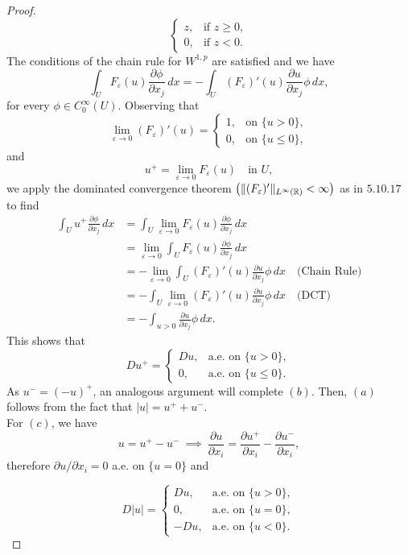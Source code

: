 \documentclass{article}
\DeclarePairedDelimiter{\norm}{\lVert}{\rVert}
\begin{document}
\begin{flushleft}
\begin{proof}
$$\begin{cases}
      z,& \text{if $z\ge 0$}, \\
      0, & \text{if $z<0$.}
   \end{cases}$$
The conditions of the chain rule for $W^{1,p}$ are satisfied and we have
$$\int_U F_{\varepsilon}(u)\frac{\partial \phi}{\partial x_j}\,dx = -\int_U (F_{\varepsilon})'(u)\frac{\partial u}{\partial x_j}\phi\,dx,$$
for every $\phi\in C_0^{\infty}(U)$. Observing that
$$\lim_{\varepsilon\to 0}(F_{\varepsilon})'(u)=\begin{cases} 
      1,& \text{on $\{u> 0\}$}, \\
      0, & \text{on $\{u\le0\}$},\end{cases}$$
and
$$u^+ = \lim_{\varepsilon\to 0}F_{\varepsilon}(u)\quad \text{in $U$},$$
we apply the dominated convergence theorem $\left(\norm{(F_{\varepsilon})'}_{L^{\infty}(\mathbb R)}< \infty\right)$ as in $5.10.17$ to find
\begin{align*}
    \int_U u^+ \frac{\partial \phi}{\partial x_j}\,dx&=
    \int_U \lim_{\varepsilon\to 0}F_{\varepsilon}(u) \frac{\partial \phi}{\partial x_j}\,dx\\&=
    \lim_{\varepsilon\to 0} \int_U F_{\varepsilon}(u) \frac{\partial \phi}{\partial x_j}\,dx\\&=
    - \lim_{\varepsilon\to 0} \int_U (F_{\varepsilon})'(u)\frac{\partial u}{\partial x_j}\phi\,dx \quad\text{(Chain Rule)}
    \\&=
    -\int_U \lim_{\varepsilon\to 0}(F_{\varepsilon})'(u)\frac{\partial u}{\partial x_j}\phi\,dx \quad\text{(DCT)}\\&=
    -\int_{u > 0}\frac{\partial u}{\partial x_j}\phi\,dx.
\end{align*}
This shows that $$Du^+=\begin{cases} 
      Du, & \text{a.e. on $\{u > 0\}$}, \\
      0, & \text{a.e. on $\{u\le 0\}$}.
   \end{cases}$$ 
As $u^- = (-u)^+$, an analogous argument will complete $(b).$ Then, $(a)$ follows from the fact that $|u|=u^+ + u^-$. 
\\
\bigskip
For $(c)$, we have 
$$u = u^{+} - u^{-} ~\implies~ \frac{\partial u}{\partial x_i}=\frac{\partial u^{+}}{\partial x_i}-\frac{\partial u^{-}}{\partial x_i} ,$$ 
therefore ${\partial u}/{\partial x_i}=0$ a.e. on $\{u=0\}$ and 

$$D|u|=\begin{cases} 
      Du, & \text{a.e. on $\{u > 0\}$}, \\
      0, & \text{a.e. on $\{u=0\}$},\\
      -Du, & \text{a.e. on  $\{u<0\}$}.
   \end{cases}$$ 
\end{proof}

\end{flushleft}
\end{document}

